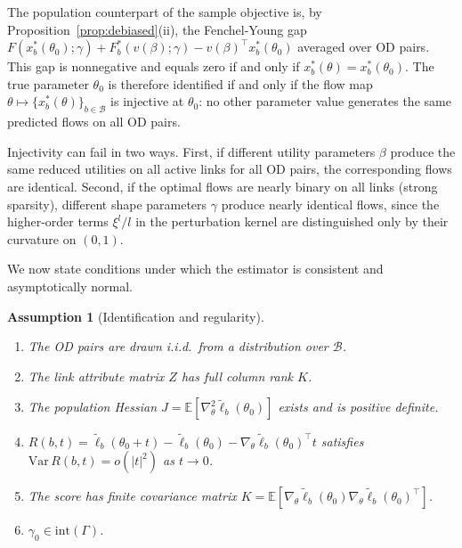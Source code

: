 \documentclass[12pt]{article}
\newcommand{\cB}{\mathcal{B}}
\newtheorem{assumption}{Assumption}
\begin{document}
The population counterpart of the sample objective is, by Proposition~\ref{prop:debiased}(ii), the Fenchel-Young gap $F(x^*_b(\theta_0); \gamma) + F^*_b(v(\beta); \gamma) - v(\beta)^\top x^*_b(\theta_0)$ averaged over OD pairs. This gap is nonnegative and equals zero if and only if $x^*_b(\theta) = x^*_b(\theta_0)$. The true parameter $\theta_0$ is therefore identified if and only if the flow map $\theta \mapsto \{x^*_b(\theta)\}_{b \in \cB}$ is injective at $\theta_0$: no other parameter value generates the same predicted flows on all OD pairs.

Injectivity can fail in two ways. First, if different utility parameters $\beta$ produce the same reduced utilities on all active links for all OD pairs, the corresponding flows are identical. Second, if the optimal flows are nearly binary on all links (strong sparsity), different shape parameters $\gamma$ produce nearly identical flows, since the higher-order terms $\xi^l/l$ in the perturbation kernel are distinguished only by their curvature on $(0,1)$.


We now state conditions under which the estimator is consistent and asymptotically normal.

\begin{assumption}[Identification and regularity]\label{as:identification}
\begin{enumerate}
    \item[(i)] The OD pairs are drawn i.i.d.\ from a distribution over $\cB$.
    \item[(ii)] The link attribute matrix $Z$ has full column rank $K$.
    \item[(iii)] The population Hessian $J = \mathbb{E}[\nabla^2_\theta \tilde{\ell}_b(\theta_0)]$ exists and is positive definite.
    \item[(iv)] $R(b, t) = \tilde{\ell}_b(\theta_0 + t) - \tilde{\ell}_b(\theta_0) - \nabla_\theta \tilde{\ell}_b(\theta_0)^\top t$ satisfies $\mathrm{Var}\, R(b, t) = o(|t|^2)$ as $t \to 0$.
    \item[(v)] The score has finite covariance matrix $K = \mathbb{E}[\nabla_\theta \tilde{\ell}_b(\theta_0) \nabla_\theta \tilde{\ell}_b(\theta_0)^\top]$.
    \item[(vi)] $\gamma_0 \in \mathrm{int}(\Gamma)$.
\end{enumerate}
\end{assumption}
\end{document}
